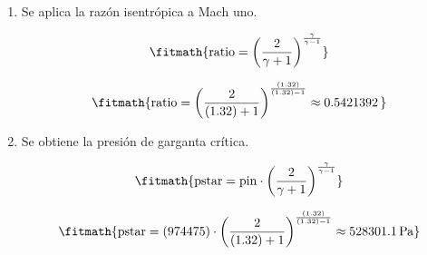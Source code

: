 \begin{enumerate}

\item Se aplica la razón isentrópica a Mach uno.

\[\fitmath{\mathrm{ratio}={\left(\frac{2}{\gamma+1}\right)}^{\frac{\gamma}{\gamma-1}}}\]

\[\fitmath{\mathrm{ratio}={\left(\frac{2}{(1.32)+1}\right)}^{\frac{(1.32)}{(1.32)-1}}\approx 0.5421392\,}\]

\item Se obtiene la presión de garganta crítica.

\[\fitmath{\mathrm{pstar}=\mathrm{pin}\cdot {\left(\frac{2}{\gamma+1}\right)}^{\frac{\gamma}{\gamma-1}}}\]

\[\fitmath{\mathrm{pstar}=(974475)\cdot {\left(\frac{2}{(1.32)+1}\right)}^{\frac{(1.32)}{(1.32)-1}}\approx 528301.1\,\mathrm{Pa}}\]

\end{enumerate}
